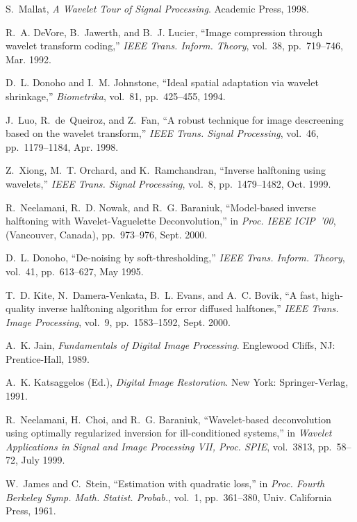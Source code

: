 \documentclass[11pt]{article}
\begin{document}
\begin{thebibliography}{10}
S.~Mallat, {\em A Wavelet Tour of Signal Processing}.
\newblock Academic Press, 1998.

R.~A. DeVore, B.~Jawerth, and B.~J. Lucier, ``Image compression through wavelet
  transform coding,'' {\em IEEE Trans. Inform. Theory}, vol.~38, pp.~719--746,
  Mar. 1992.

D.~L. Donoho and I.~M. Johnstone, ``Ideal spatial adaptation via wavelet
  shrinkage,'' {\em Biometrika}, vol.~81, pp.~425--455, 1994.

J.~Luo, R.~{de~Queiroz}, and Z.~Fan, ``A robust technique for image descreening
  based on the wavelet transform,'' {\em IEEE Trans. Signal Processing},
  vol.~46, pp.~1179--1184, Apr. 1998.

Z.~Xiong, M.~T. Orchard, and K.~Ramchandran, ``Inverse halftoning using
  wavelets,'' {\em IEEE Trans. Signal Processing}, vol.~8, pp.~1479--1482, Oct.
  1999.

R.~Neelamani, R.~D. Nowak, and R.~G. Baraniuk, ``Model-based inverse halftoning
  with {W}avelet-{V}aguelette {D}econvolution,'' in {\em Proc. IEEE ICIP~'00},
  (Vancouver, Canada), pp.~973--976, Sept. 2000.

D.~L. Donoho, ``De-noising by soft-thresholding,'' {\em IEEE Trans. Inform.
  Theory}, vol.~41, pp.~613--627, May 1995.

T.~D. Kite, N.~Damera-Venkata, B.~L. Evans, and A.~C. Bovik, ``A fast,
  high-quality inverse halftoning algorithm for error diffused halftones,''
  {\em IEEE Trans. Image Processing}, vol.~9, pp.~1583--1592, Sept. 2000.

A.~K. Jain, {\em Fundamentals of Digital Image Processing}.
\newblock Englewood Cliffs, NJ: Prentice-Hall, 1989.

A.~K. {Katsaggelos (Ed.)}, {\em Digital Image Restoration}.
\newblock New York: Springer-Verlag, 1991.

R.~Neelamani, H.~Choi, and R.~G. Baraniuk, ``Wavelet-based deconvolution using
  optimally regularized inversion for ill-conditioned systems,'' in {\em
  Wavelet Applications in Signal and Image Processing VII, Proc. SPIE},
  vol.~3813, pp.~58--72, July 1999.

W.~James and C.~Stein, ``Estimation with quadratic loss,'' in {\em Proc. Fourth
  Berkeley Symp. Math. Statist. Probab.}, vol.~1, pp.~361--380, Univ.
  California Press, 1961.


\end{thebibliography}
\end{document}
